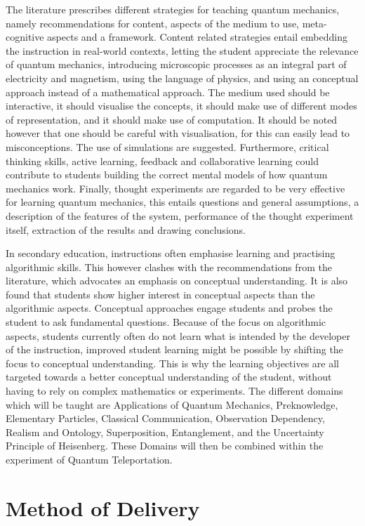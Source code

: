 \documentclass[11pt,twoside]{report} %
\begin{document}
The literature prescribes different strategies for teaching quantum mechanics, namely recommendations for content, aspects of the medium to use, meta-cognitive aspects and a framework. Content related strategies entail embedding the instruction in real-world contexts, letting the student appreciate the relevance of quantum mechanics, introducing microscopic processes as an integral part of electricity and magnetism, using the language of physics, and using an conceptual approach instead of a mathematical approach. The medium used should be interactive, it should visualise the concepts, it should make use of different modes of representation, and it should make use of computation. It should be noted however that one should be careful with visualisation, for this can easily lead to misconceptions. The use of simulations are suggested. Furthermore, critical thinking skills, active learning, feedback and collaborative learning could contribute to students building the correct mental models of how quantum mechanics work. Finally, thought experiments are regarded to be very effective for learning quantum mechanics, this entails questions and general assumptions, a description of the features of the system, performance of the thought experiment itself, extraction of the results and drawing conclusions.

In secondary education, instructions often emphasise learning and practising algorithmic skills. This however clashes with the recommendations from the literature, which advocates an emphasis on conceptual understanding. It is also found that students show higher interest in conceptual aspects than the algorithmic aspects. Conceptual approaches engage students and probes the student to ask fundamental questions. Because of the focus on algorithmic aspects, students currently often do not learn what is intended by the developer of the instruction, improved student learning might be possible by shifting the focus to conceptual understanding. This is why the learning objectives are all targeted towards a better conceptual understanding of the student, without having to rely on complex mathematics or experiments. The different domains which will be taught are Applications of Quantum Mechanics, Preknowledge, Elementary Particles, Classical Communication, Observation Dependency, Realism and Ontology, Superposition, Entanglement, and the Uncertainty Principle of Heisenberg. These Domains will then be combined within the experiment of Quantum Teleportation.

\section{Method of Delivery}
\end{document}
